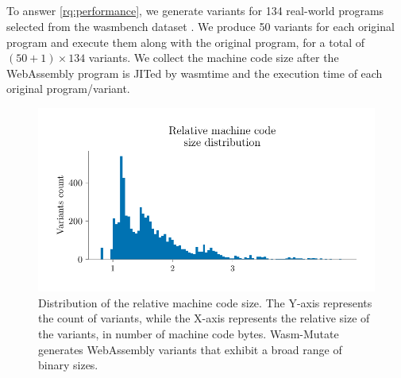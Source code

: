 \documentclass[a4paper,fleqn]{cas-dc}
\newcommand{\tool}{{\sc Wasm-Mutate}\xspace}
\newcommand{\Wasm}{WebAssembly\xspace}
\newenvironment{revision1}{\color{blue}}{}
\begin{document}
\begin{revision1}
\subsection{\rqperformance}



To answer \ref{rq:performance}, we generate variants for 134 real-world programs selected from the wasmbench dataset \cite{hilbig2021empirical}.
We produce 50 variants for each original program and execute them along with the original program, for a total of $(50 + 1)\times134$ variants.
We collect the machine code size after the \Wasm program is JITed by wasmtime and the execution time of each original program/variant.


\begin{figure}
    \centering
    \includegraphics[width=\linewidth]{plots/rq4/mcsize.pdf}
    \caption{Distribution of the relative machine code size.
The Y-axis represents the count of variants, while the X-axis represents the relative size of the variants, in number of machine code bytes. \tool generates \Wasm variants that exhibit a broad range of binary sizes.}
  \label{impact:mcsize}
\end{figure} %



\end{revision1}
\end{document}
